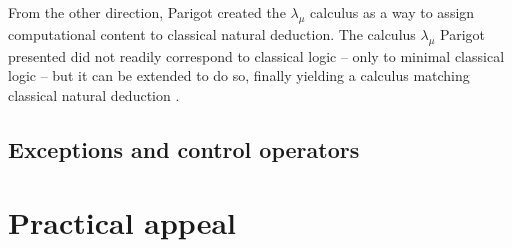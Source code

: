 From the other direction, Parigot created the $\lambda_\mu$ calculus \cite{parigot92}
as a way to assign computational content to classical natural deduction. The calculus
$\lambda_\mu$ Parigot presented did not readily correspond to classical logic --
only to minimal classical logic -- but it
can be extended to do so, finally yielding a calculus matching classical natural deduction
\cite{ariola-herbelin}.


\subsection{Exceptions and control operators}





\section{Practical appeal}


\label{chap:dependent-types}







































































